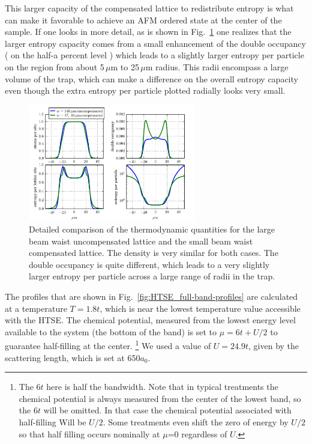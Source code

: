 \documentclass[11pt,letter]{article}
\begin{document}
This larger capacity of the compensated lattice to redistribute entropy is what
can make it favorable to achieve an AFM ordered state at the center of the
sample.   If one looks in more detail, as is shown in
Fig.~\ref{fig:HTSE_compare-thermo} one realizes that the larger entropy
capacity comes from a small enhancement of the double occupancy ( on the half-a
percent level ) which leads to a slightly larger entropy per particle on the
region from about 5\,$\mu$m to 25\,$\mu$m radius.   This radii encompass a
large volume of the trap, which can make a difference on the overall entropy
capacity even though the extra entropy per particle plotted radially looks very
small.  
\begin{figure}
    \centering
\includegraphics[width=0.65\textwidth]{figures/HTSE_compare-thermo.png}
\caption{Detailed comparison of the thermodynamic quantities for the large beam
waist uncompensated lattice and the small beam waist compensated lattice.  The
density is very similar for both cases.  The double occupancy is quite
different, which leads to a very slightly larger entropy per particle across a
large range of radii in the trap. }\label{fig:HTSE_compare-thermo}
\end{figure}


The profiles that are shown in Fig.~\ref{fig:HTSE_full-band-profiles} are
calculated at a temperature $T=1.8t$, which is near the lowest temperature
value accessible with the HTSE.   The chemical potential, measured from the
lowest energy level available to the system (the bottom of the band) is set to
$\mu=6t +U/2$ to guarantee half-filling at the center.  \footnote{ The $6t$
here is half the bandwidth.  Note that in typical treatments the chemical
potential is always measured from the center of the lowest band, so the $6t$
will be omitted. In that case the chemical potential associated with
half-filling Will be $U/2$.  Some treatments even shift the zero of energy by
$U/2$ so that half filling occurs nominally at $\mu$=0 regardless of $U$. } We
used a value of $U=24.9t$,  given by the scattering length, which is set at
650$a_{0}$.   
\end{document}
